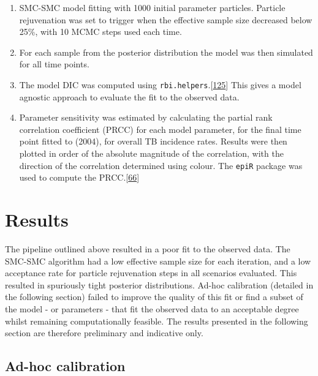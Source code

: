 \documentclass[11pt,twoside]{bristolthesis}
\begin{document}
\begin{enumerate}
  \item
    SMC-SMC model fitting with 1000 initial parameter particles. Particle rejuvenation was set to trigger when the effective sample size decreased below 25\%, with 10 MCMC steps used each time.
  \item
    For each sample from the posterior distribution the model was then simulated for all time points.
  \item
    The model DIC was computed using \texttt{rbi.helpers}.{[}\protect\hyperlink{ref-Funk:2019uw}{125}{]} This gives a model agnostic approach to evaluate the fit to the observed data.
  \item
    Parameter sensitivity was estimated by calculating the partial rank correlation coefficient (PRCC) for each model parameter, for the final time point fitted to (2004), for overall TB incidence rates. Results were then plotted in order of the absolute magnitude of the correlation, with the direction of the correlation determined using colour. The \texttt{epiR} package was used to compute the PRCC.{[}\protect\hyperlink{ref-EpiR}{66}{]}
  \end{enumerate}
  \hypertarget{results-3}{%
  \section{Results}\label{results-3}}
  
  The pipeline outlined above resulted in a poor fit to the observed data. The SMC-SMC algorithm had a low effective sample size for each iteration, and a low acceptance rate for particle rejuvenation steps in all scenarios evaluated. This resulted in spuriously tight posterior distributions. Ad-hoc calibration (detailed in the following section) failed to improve the quality of this fit or find a subset of the model - or parameters - that fit the observed data to an acceptable degree whilst remaining computationally feasible. The results presented in the following section are therefore preliminary and indicative only.
  
  \hypertarget{ad-hoc-calibration}{%
  \subsection{Ad-hoc calibration}\label{ad-hoc-calibration}}
  
\end{document}
